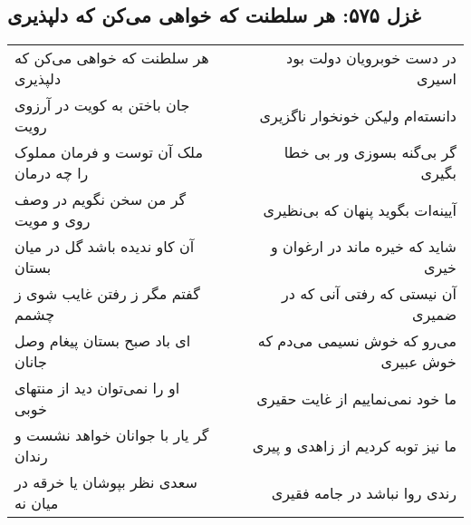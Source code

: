 \begin{center}
\section*{غزل ۵۷۵: هر سلطنت که خواهی می‌کن که دلپذیری}
\label{sec:575}
\begin{longtable}{l p{0.5cm} r}
هر سلطنت که خواهی می‌کن که دلپذیری
&&
در دست خوبرویان دولت بود اسیری
\\
جان باختن به کویت در آرزوی رویت
&&
دانسته‌ام ولیکن خونخوار ناگزیری
\\
ملک آن توست و فرمان مملوک را چه درمان
&&
گر بی‌گنه بسوزی ور بی خطا بگیری
\\
گر من سخن نگویم در وصف روی و مویت
&&
آیینه‌ات بگوید پنهان که بی‌نظیری
\\
آن کاو ندیده باشد گل در میان بستان
&&
شاید که خیره ماند در ارغوان و خیری
\\
گفتم مگر ز رفتن غایب شوی ز چشمم
&&
آن نیستی که رفتی آنی که در ضمیری
\\
ای باد صبح بستان پیغام وصل جانان
&&
می‌رو که خوش نسیمی می‌دم که خوش عبیری
\\
او را نمی‌توان دید از منتهای خوبی
&&
ما خود نمی‌نماییم از غایت حقیری
\\
گر یار با جوانان خواهد نشست و رندان
&&
ما نیز توبه کردیم از زاهدی و پیری
\\
سعدی نظر بپوشان یا خرقه در میان نه
&&
رندی روا نباشد در جامه فقیری
\\
\end{longtable}
\end{center}
